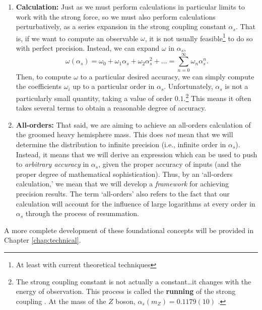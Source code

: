 \documentclass[../thesis.tex]{subfiles}
\begin{document}
\begin{enumerate}
		\item \textbf{Calculation:} Just as we must perform calculations in particular limits to work with the strong force, so we must also perform calculations perturbatively, as a series expansion in the strong coupling constant $\alpha_s$. That is, if we want to compute an observable $\omega$, it is not usually feasible\footnote{At least with current theoretical techniques} to do so with perfect precision. Instead, we can expand $\omega$ in $\alpha_s$,
		\begin{equation}
			\omega(\alpha_s) = \omega_0 + \omega_1 \alpha_s + \omega_2 \alpha_s^2 + \dots = \sum_{n = 0}^\infty \omega_n \alpha_s^n.
		\end{equation}
		Then, to compute $\omega$ to a particular desired accuracy, we can simply compute the coefficients $\omega_i$ up to a particular order in $\alpha_s$. Unfortunately, $\alpha_s$ is not a particularly small quantity, taking a value of order $0.1$.\footnote{The strong coupling constant is not actually a constant\dots it changes with the energy of observation. This process is called the \textbf{running} of the strong coupling \cite{larkoski_elementary_2019-1}. At the mass of the $Z$ boson, $\alpha_s(m_Z) = 0.1179(10)$ \cite{particle_data_group_review_2020}.} This means it often takes several terms to obtain a reasonable degree of accuracy.

		\item \textbf{All-orders:} That said, we are aiming to achieve an all-orders calculation of the groomed heavy hemisphere mass. This does \textit{not} mean that we will determine the distribution to infinite precision (i.e., infinite order in $\alpha_s$). Instead, it means that we will derive an expression which can be used to push to \textit{arbitrary accuracy} in $\alpha_s$, given the proper accuracy of inputs (and the proper degree of mathematical sophistication). Thus, by an `all-orders calculation,' we mean that we will develop a \textit{framework} for achieving precision results. The term `all-orders' also refers to the fact that our calculation will account for the influence of large logarithms at every order in $\alpha_s$ through the process of resummation.
	\end{enumerate}
	A more complete development of these foundational concepts will be provided in Chapter \ref{chap:technical}.
\end{document}
